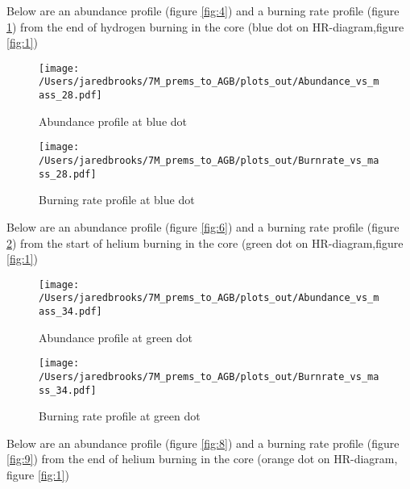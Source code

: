 \documentclass{article}
\begin{document}
        Below are an abundance profile (figure \ref{fig:4}) and a burning rate profile (figure \ref{fig:5}) from the end of hydrogen burning in the core (blue dot on HR-diagram,figure \ref{fig:1})

        \begin{figure}[H]
            \begin{minipage}[b]{0.5\linewidth}
            \centering
            \texttt{[image: /Users/jaredbrooks/7M\_prems\_to\_AGB/plots\_out/Abundance\_vs\_mass\_28.pdf]}
            \caption{Abundance profile at blue dot}
            \label{fig:4}
          \end{minipage}
          \hspace{0cm}
          \begin{minipage}[b]{0.5\linewidth}
            \centering
            \texttt{[image: /Users/jaredbrooks/7M\_prems\_to\_AGB/plots\_out/Burnrate\_vs\_mass\_28.pdf]}
            \caption{Burning rate profile at blue dot}
            \label{fig:5}
          \end{minipage}
        \end{figure}

        \pagebreak

        Below are an abundance profile (figure \ref{fig:6}) and a burning rate profile (figure \ref{fig:7}) from the start of helium burning in the core (green dot on HR-diagram,figure \ref{fig:1})

        \begin{figure}[H]
          \begin{minipage}[b]{0.5\linewidth}
            \centering
            \texttt{[image: /Users/jaredbrooks/7M\_prems\_to\_AGB/plots\_out/Abundance\_vs\_mass\_34.pdf]}
            \caption{Abundance profile at green dot}
            \label{fig:6}
          \end{minipage}
          \hspace{0cm}
          \begin{minipage}[b]{0.5\linewidth}
            \centering
            \texttt{[image: /Users/jaredbrooks/7M\_prems\_to\_AGB/plots\_out/Burnrate\_vs\_mass\_34.pdf]}
            \caption{Burning rate profile at green dot}
            \label{fig:7}
          \end{minipage}
        \end{figure}

        Below are an abundance profile (figure \ref{fig:8}) and a burning rate profile (figure \ref{fig:9}) from the end of helium burning in the core (orange dot on HR-diagram, figure \ref{fig:1})
\end{document}
